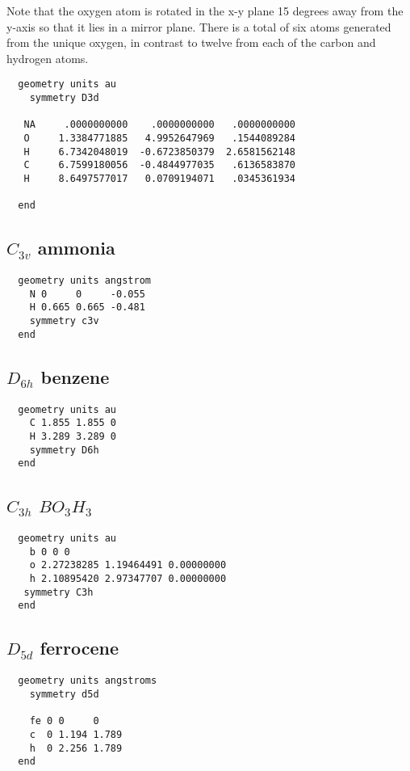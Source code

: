  Note that the oxygen atom is rotated in the x-y plane 15
  degrees away from the y-axis so that it lies in a mirror
  plane.  There is a total of six atoms generated from the
  unique oxygen, in contrast to twelve from each of the carbon
  and hydrogen atoms.

\begin{verbatim}
  geometry units au
    symmetry D3d

   NA     .0000000000    .0000000000   .0000000000
   O     1.3384771885   4.9952647969   .1544089284
   H     6.7342048019  -0.6723850379  2.6581562148
   C     6.7599180056  -0.4844977035   .6136583870
   H     8.6497577017   0.0709194071   .0345361934

  end
\end{verbatim}

  \subsection{\protect$C_{3v}$ ammonia}

\begin{verbatim}
  geometry units angstrom
    N 0     0     -0.055 
    H 0.665 0.665 -0.481 
    symmetry c3v
  end
\end{verbatim}

  \subsection{\protect$D_{6h}$ benzene}

\begin{verbatim}
  geometry units au
    C 1.855 1.855 0 
    H 3.289 3.289 0 
    symmetry D6h
  end
\end{verbatim}

  \subsection{\protect$C_{3h}$ \protect$BO_3H_3$}

\begin{verbatim}
  geometry units au
    b 0 0 0 
    o 2.27238285 1.19464491 0.00000000 
    h 2.10895420 2.97347707 0.00000000 
   symmetry C3h
  end
\end{verbatim}

  \subsection{\protect$D_{5d}$ ferrocene}

\begin{verbatim}
  geometry units angstroms
    symmetry d5d

    fe 0 0     0 
    c  0 1.194 1.789 
    h  0 2.256 1.789 
  end
\end{verbatim}

